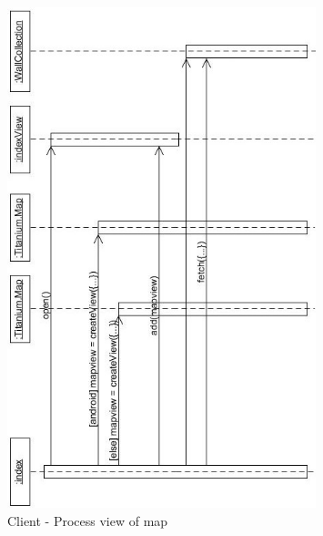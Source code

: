 \documentclass[11pt]{book}
\begin{document}
\begin{figure}[H]
      \centering
      \includegraphics[width=0.8\textwidth]{Figures/Architecture/Sequence/client/map.jpg}
      \caption{Client - Process view of map}
      \label{fig:arch_client_process}
\end{figure}
\end{document}
